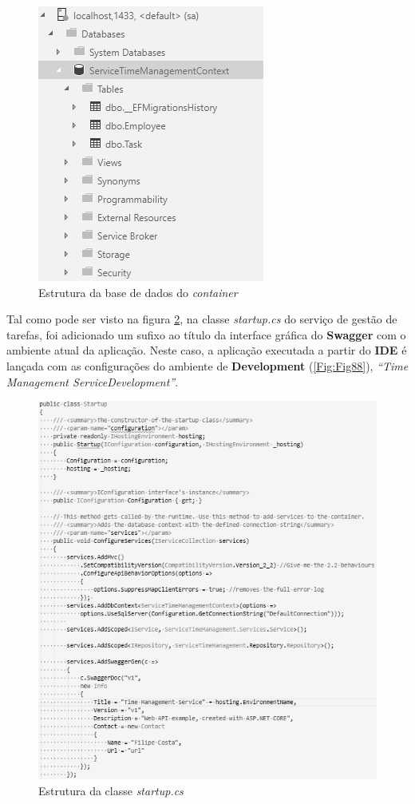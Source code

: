 \begin{figure}[hbt!]
\centering
\includegraphics[width=0.35\linewidth]{Cap7/TimeManagementDatabase.png}
\caption{Estrutura da base de dados do \textit{container}}
\label{Fig:Fig89}
\end{figure}

\hspace{1cm}Tal como pode ser visto na figura \ref{Fig:Fig90}, na classe \textit{startup.cs} do serviço de gestão de tarefas, foi adicionado um sufixo ao título da interface gráfica do \textbf{Swagger} com o ambiente atual da aplicação. Neste caso, a aplicação executada a partir do \textbf{IDE} é lançada com as configurações do ambiente de \textbf{Development} (\ref{Fig:Fig88}), \textit{``Time Management ServiceDevelopment''}.

\begin{figure}[hbt!]
\centering
\includegraphics[width=0.9\linewidth]{Cap7/TimeManagementStartupClass.png}
\caption{Estrutura da classe \textit{startup.cs}}
\label{Fig:Fig90}
\end{figure}

